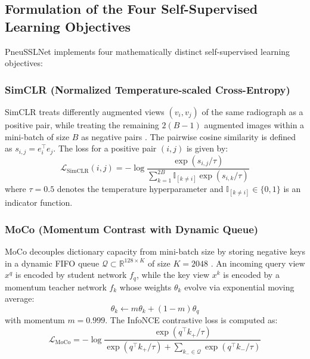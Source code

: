 \documentclass[journal,article,submit,moreauthors,pdftex]{Definitions/tsp}
\begin{document}
\subsection{Formulation of the Four Self-Supervised Learning Objectives} \label{sect:s3dot4}
PneuSSLNet implements four mathematically distinct self-supervised learning objectives:

\subsubsection{SimCLR (Normalized Temperature-scaled Cross-Entropy)}
SimCLR treats differently augmented views $(v_i, v_j)$ of the same radiograph as a positive pair, while treating the remaining $2(B-1)$ augmented images within a mini-batch of size $B$ as negative pairs \cite{Chen20}. The pairwise cosine similarity is defined as $s_{i,j} = e_i^\top e_j$. The loss for a positive pair $(i, j)$ is given by:
\begin{equation}
\mathcal{L}_{\text{SimCLR}}(i, j) = -\log \frac{\exp(s_{i,j} / \tau)}{\sum_{k=1}^{2B} \mathbb{I}_{[k \neq i]} \exp(s_{i,k} / \tau)}
\end{equation}
where $\tau = 0.5$ denotes the temperature hyperparameter and $\mathbb{I}_{[k \neq i]} \in \{0, 1\}$ is an indicator function.

\subsubsection{MoCo (Momentum Contrast with Dynamic Queue)}
MoCo decouples dictionary capacity from mini-batch size by storing negative keys in a dynamic FIFO queue $\mathcal{Q} \subset \mathbb{R}^{128 \times K}$ of size $K=2048$ \cite{He20}. An incoming query view $x^q$ is encoded by student network $f_q$, while the key view $x^k$ is encoded by a momentum teacher network $f_k$ whose weights $\theta_k$ evolve via exponential moving average:
\begin{equation}
\theta_k \leftarrow m \theta_k + (1-m) \theta_q
\end{equation}
with momentum $m=0.999$. The InfoNCE contrastive loss is computed as:
\begin{equation}
\mathcal{L}_{\text{MoCo}} = -\log \frac{\exp(q^\top k_+ / \tau)}{\exp(q^\top k_+ / \tau) + \sum_{k_- \in \mathcal{Q}} \exp(q^\top k_- / \tau)}
\end{equation}
\end{document}
